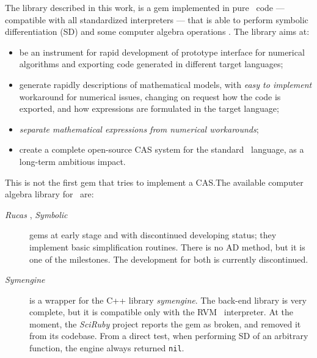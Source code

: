 The library described in this work, is a gem implemented in pure \Ruby~code --- compatible with all standardized interpreters --- that is able to perform symbolic differentiation (SD) and some computer algebra operations \cite{von2013modern}. The library aims at:
\begin{itemize}
  \item be an instrument for rapid development of prototype interface for numerical algorithms and exporting code generated in different target languages;
  \item generate rapidly descriptions of mathematical models, with \emph{easy to implement} workaround for numerical issues, changing on request how the code is exported, and how expressions are formulated in the target language;
  \item \emph{separate mathematical expressions from numerical workarounds};
  \item create a complete open-source CAS system for the standard \Ruby~language, as a long-term ambitious impact.
\end{itemize}

This is not the first gem that tries to implement a CAS.\@ The available computer algebra library for \Ruby~are:
\begin{description}
  \item [\emph{Rucas} \cite{rucas}, \emph{Symbolic} \cite{symbolic}] gems at early stage and with discontinued developing status; they implement basic simplification routines. There is no AD method, but it is one of the milestones. The development for both is currently discontinued.
  \item [\emph{Symengine} \cite{symengine}] is a wrapper for the C++ library \emph{symengine}. The back-end library is very complete, but it is compatible only with the RVM \Ruby~interpreter. At the moment, the \emph{SciRuby} project reports the gem as broken, and removed it from its codebase. From a direct test, when performing SD of an arbitrary function, the engine always returned \texttt{nil}.
\end{description}
